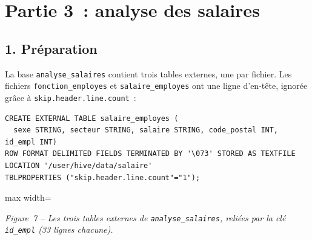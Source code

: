 \section*{Partie 3~: analyse des salaires}
{}

\subsection*{1. Préparation}
{}

\noindent La base \texttt{analyse\_salaires} contient trois tables externes, une par fichier. Les fichiers \texttt{fonction\_employes} et \texttt{salaire\_employes} ont une ligne d'en-tête, ignorée grâce à \texttt{skip.header.line.count}~:

\begin{verbatim}
CREATE EXTERNAL TABLE salaire_employes (
  sexe STRING, secteur STRING, salaire STRING, code_postal INT, id_empl INT)
ROW FORMAT DELIMITED FIELDS TERMINATED BY '\073' STORED AS TEXTFILE
LOCATION '/user/hive/data/salaire'
TBLPROPERTIES ("skip.header.line.count"="1");
\end{verbatim}


\begin{center}
\begin{adjustbox}{max width=\linewidth}
\end{adjustbox}\par\nobreak\smallskip
\small\textit{Figure~7 -- Les trois tables externes de \texttt{analyse\_salaires}, reliées par la clé \texttt{id\_empl} (33 lignes chacune).}
\end{center}

